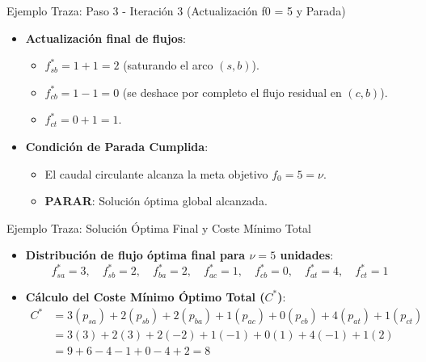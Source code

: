 \documentclass[
  ignorenonframetext,
]{beamer}
\providecommand{\tightlist}{%
  \setlength{\itemsep}{0pt}\setlength{\parskip}{0pt}}
\begin{document}
\begin{frame}{Ejemplo Traza: Paso 3 - Iteración 3 (Actualización f0 = 5
y Parada)}
\label{ejemplo-traza-paso-3---iteraciuxf3n-3-actualizaciuxf3n-f0-5-y-parada}
\begin{itemize}
\tightlist
\item
  \textbf{Actualización final de flujos}:

  \begin{itemize}
  \tightlist
  \item
    \(f_{sb}^* = 1 + 1 = 2\) (saturando el arco \((s,b)\)).
  \item
    \(f_{cb}^* = 1 - 1 = 0\) (se deshace por completo el flujo residual
    en \((c,b)\)).
  \item
    \(f_{ct}^* = 0 + 1 = 1\).
  \end{itemize}
\item
  \textbf{Condición de Parada Cumplida}:

  \begin{itemize}
  \tightlist
  \item
    El caudal circulante alcanza la meta objetivo \(f_0 = 5 = \nu\).
  \item
    \textbf{PARAR}: Solución óptima global alcanzada.
  \end{itemize}
\end{itemize}
\end{frame}

\begin{frame}{Ejemplo Traza: Solución Óptima Final y Coste Mínimo Total}
\label{ejemplo-traza-soluciuxf3n-uxf3ptima-final-y-coste-muxednimo-total}
\begin{itemize}
\item
  \textbf{Distribución de flujo óptima final para \(\nu = 5\) unidades}:
  \[f_{sa}^* = 3, \quad f_{sb}^* = 2, \quad f_{ba}^* = 2, \quad f_{ac}^* = 1, \quad f_{cb}^* = 0, \quad f_{at}^* = 4, \quad f_{ct}^* = 1\]
\item
  \textbf{Cálculo del Coste Mínimo Óptimo Total (\(C^*\))}: \[
  \begin{aligned}
  C^* &= 3(p_{sa}) + 2(p_{sb}) + 2(p_{ba}) + 1(p_{ac}) + 0(p_{cb}) + 4(p_{at}) + 1(p_{ct}) \\
  &= 3(3) + 2(3) + 2(-2) + 1(-1) + 0(1) + 4(-1) + 1(2) \\
  &= 9 + 6 - 4 - 1 + 0 - 4 + 2 = 8
  \end{aligned}
  \]
\end{itemize}
\end{frame}
\end{document}
